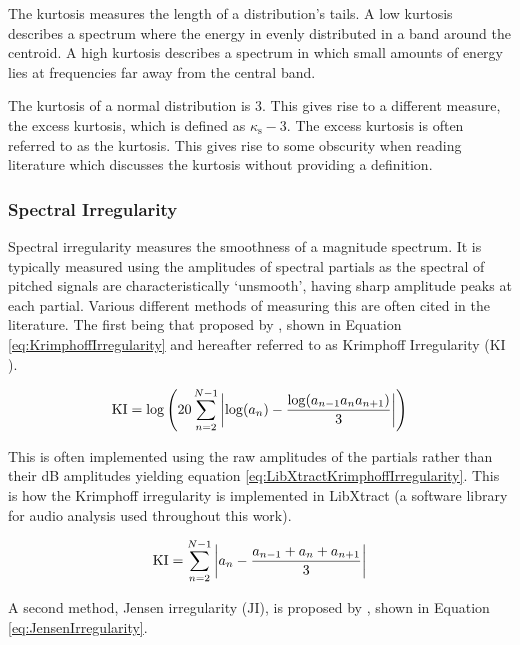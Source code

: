 			The kurtosis measures the length of a distribution's tails. A low kurtosis describes a spectrum
			where the energy in evenly distributed in a band around the centroid. A high kurtosis describes a
			spectrum in which small amounts of energy lies at frequencies far away from the central band.

			The kurtosis of a normal distribution is 3. This gives rise to a different measure, the excess
			kurtosis, which is defined as $\kappa_{\textrm{s}} - 3$. The excess kurtosis is often referred to
			as the kurtosis. This gives rise to some obscurity when reading literature which discusses the
			kurtosis without providing a definition.

		\subsubsection*{Spectral Irregularity}
			Spectral irregularity measures the smoothness of a magnitude spectrum. It is typically measured
			using the amplitudes of spectral partials as the spectral of pitched signals are characteristically
			`unsmooth', having sharp amplitude peaks at each partial. Various different methods of measuring
			this are often cited in the literature. The first being that proposed by
			\citet{krimphoff1994caracterisation}, shown in Equation \ref{eq:KrimphoffIrregularity} and
			hereafter referred to as Krimphoff Irregularity ($\textrm{KI}$).

			\begin{equation}
				\textrm{KI} = \log \left( 20 \sum_{n = 2}^{N - 1}
							  \left|\log(a_{n}) - \frac{\log(a_{n-1}a_{n}a_{n+1})}{3}\right|
						   \right)
				\label{eq:KrimphoffIrregularity}
			\end{equation}

			This is often implemented using the raw amplitudes of the partials rather than their dB amplitudes
			yielding equation \ref{eq:LibXtractKrimphoffIrregularity}. This is how the Krimphoff irregularity
			is implemented in LibXtract \citep{bullock2007libxtract} (a software library for audio analysis
			used throughout this work).

			\begin{equation}
				\textrm{KI} = \sum_{n = 2}^{N - 1}
						  \left|a_{n} - \frac{a_{n-1} + a_{n} + a_{n+1}}{3}\right|
				\label{eq:LibXtractKrimphoffIrregularity}
			\end{equation}

			A second method, Jensen irregularity ($\textrm{JI}$), is proposed by \citet{jensen1999timbre},
			shown in Equation \ref{eq:JensenIrregularity}.

